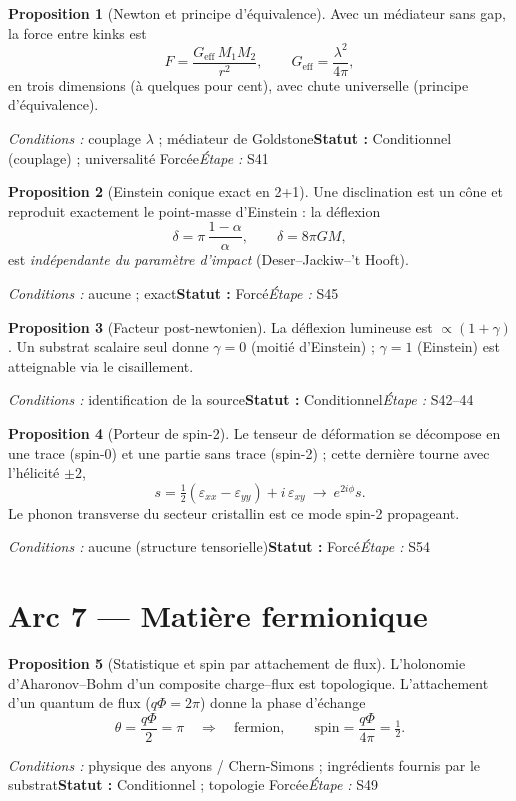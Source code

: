 \documentclass[11pt,a4paper]{article}
\theoremstyle{definition}
\newtheorem{prop}{Proposition}
\newcommand{\statut}[3]{\par\smallskip\noindent\textit{Conditions :} #1\quad\textbf{Statut :} #2\quad\textit{Étape :} #3\par\medskip}
\begin{document}
\begin{prop}[Newton et principe d'équivalence]
Avec un médiateur sans gap, la force entre kinks est
\[ F=\frac{G_{\mathrm{eff}}\,M_1M_2}{r^2},\qquad G_{\mathrm{eff}}=\frac{\lambda^2}{4\pi}, \]
en trois dimensions (à quelques pour cent), avec chute universelle (principe d'équivalence).
\end{prop}
\statut{couplage $\lambda$ ; médiateur de Goldstone}{Conditionnel (couplage) ; universalité Forcée}{S41}

\begin{prop}[Einstein conique exact en 2+1]
Une disclination est un cône et reproduit exactement le point-masse d'Einstein : la déflexion
\[ \delta=\pi\,\frac{1-\alpha}{\alpha},\qquad \delta=8\pi G M, \]
est \emph{indépendante du paramètre d'impact} (Deser--Jackiw--'t Hooft).
\end{prop}
\statut{aucune ; exact}{Forcé}{S45}

\begin{prop}[Facteur post-newtonien]
La déflexion lumineuse est $\propto(1+\gamma)$. Un substrat scalaire seul donne $\gamma=0$ (moitié d'Einstein) ; $\gamma=1$ (Einstein) est atteignable via le cisaillement.
\end{prop}
\statut{identification de la source}{Conditionnel}{S42--44}

\begin{prop}[Porteur de spin-2]
Le tenseur de déformation se décompose en une trace (spin-0) et une partie sans trace (spin-2) ; cette dernière tourne avec l'hélicité $\pm2$,
\[ s=\tfrac12(\varepsilon_{xx}-\varepsilon_{yy})+i\,\varepsilon_{xy}\ \longrightarrow\ e^{2i\phi}s. \]
Le phonon transverse du secteur cristallin est ce mode spin-2 propageant.
\end{prop}
\statut{aucune (structure tensorielle)}{Forcé}{S54}

\section*{Arc 7 — Matière fermionique}

\begin{prop}[Statistique et spin par attachement de flux]
L'holonomie d'Aharonov--Bohm d'un composite charge--flux est topologique. L'attachement d'un quantum de flux ($q\Phi=2\pi$) donne la phase d'échange
\[ \theta=\frac{q\Phi}{2}=\pi\quad\Rightarrow\quad \text{fermion},\qquad \text{spin}=\frac{q\Phi}{4\pi}=\tfrac12. \]
\end{prop}
\statut{physique des anyons / Chern-Simons ; ingrédients fournis par le substrat}{Conditionnel ; topologie Forcée}{S49}
\end{document}
